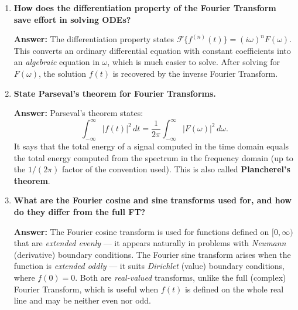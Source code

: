 \documentclass[12pt,a4paper]{article}
\begin{document}
\begin{enumerate}[label=\textbf{Q\arabic*.}, leftmargin=2.5em]
\textbf{Answer:}
The Fourier Series applies to \textbf{periodic} functions and produces a \textbf{discrete} spectrum
(line spectrum at integer multiples of the fundamental frequency).
The Fourier Transform applies to \textbf{aperiodic} functions defined on $(-\infty,\infty)$ and produces a
\textbf{continuous} spectrum $F(\omega)$ for all $\omega \in \mathbb{R}$.
The Fourier Transform can be viewed as the limit of the Fourier Series as the period $T \to \infty$.

\item \textbf{How does the differentiation property of the Fourier Transform save effort in solving ODEs?}

\textbf{Answer:}
The differentiation property states $\mathcal{F}\{f^{(n)}(t)\} = (i\omega)^n F(\omega)$.
This converts an ordinary differential equation with constant coefficients into an \emph{algebraic}
equation in $\omega$, which is much easier to solve.
After solving for $F(\omega)$, the solution $f(t)$ is recovered by the inverse Fourier Transform.

\item \textbf{State Parseval's theorem for Fourier Transforms.}

\textbf{Answer:}
Parseval's theorem states:
\[
  \int_{-\infty}^{\infty} |f(t)|^2\,dt = \frac{1}{2\pi}\int_{-\infty}^{\infty} |F(\omega)|^2\,d\omega.
\]
It says that the total energy of a signal computed in the time domain equals the total energy computed
from the spectrum in the frequency domain (up to the $1/(2\pi)$ factor of the convention used).
This is also called \textbf{Plancherel's theorem}.

\item \textbf{What are the Fourier cosine and sine transforms used for, and how do they differ from the full FT?}

\textbf{Answer:}
The Fourier cosine transform is used for functions defined on $[0,\infty)$ that are \emph{extended evenly} ---
it appears naturally in problems with \emph{Neumann} (derivative) boundary conditions.
The Fourier sine transform arises when the function is \emph{extended oddly} ---
it suits \emph{Dirichlet} (value) boundary conditions, where $f(0) = 0$.
Both are \emph{real-valued} transforms, unlike the full (complex) Fourier Transform, which is useful
when $f(t)$ is defined on the whole real line and may be neither even nor odd.

\end{enumerate}

\end{document}

